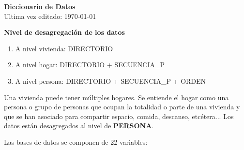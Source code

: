 \documentclass[12pt,a4paper]{article}
\begin{document}
\begin{center}
	\textbf{Diccionario de Datos} \\
	Ultima vez editado: \today
\end{center}
\vspace{10mm}

\textbf{Nivel de desagregación de los datos}
\begin{enumerate}
	\item A nivel vivienda: DIRECTORIO
	\item A nivel hogar: DIRECTORIO + SECUENCIA\_P
	\item A nivel persona: DIRECTORIO + SECUENCIA\_P + ORDEN
\end{enumerate}

Una vivienda puede tener múltiples hogares. Se entiende el hogar como una persona o grupo de personas que ocupan la totalidad o parte de una vivienda y que se han asociado para compartir espacio, comida, descanso, etcétera... Los datos están desagregados al nivel de \textbf{PERSONA}.

Las bases de datos se componen de 22 variables:
\end{document}
